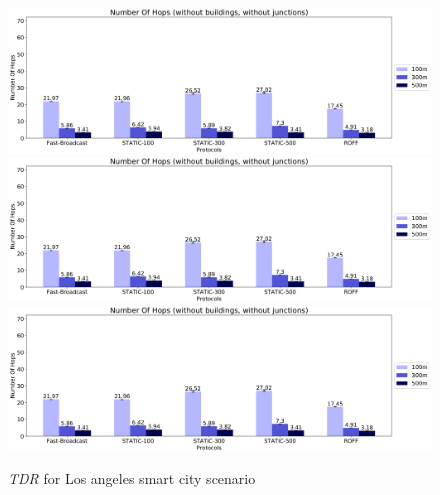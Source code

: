 	\begin{figure}[H]
		\centering
		\includegraphics[width=1.0\textwidth]{immagini/la-smart-city/b0/noh}
		\includegraphics[width=1.0\textwidth]{immagini/la-smart-city/b1/h0/noh}
		\includegraphics[width=1.0\textwidth]{immagini/la-smart-city/b1//h1/noh}
		\caption{\textit{TDR} for Los angeles smart city scenario}
		\label{fig:la-smart-city-noh}
	\end{figure}

